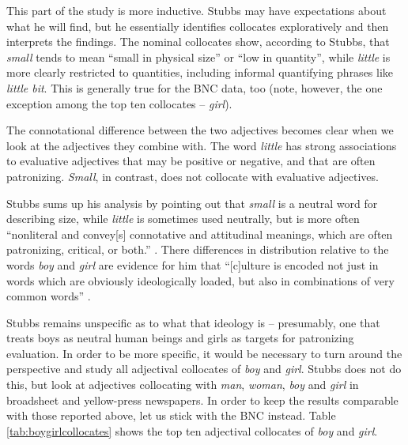 
This part of the study is more inductive. Stubbs may have expectations about what he will find, but he essentially identifies collocates exploratively and then interprets the findings. The nominal collocates show, according to Stubbs, that \textit{small} tends to mean ``small in physical size'' or ``low in quantity'', while \textit{little} is more clearly restricted to quantities, including informal quantifying phrases like \textit{little bit}. This is generally true for the BNC data, too (note, however, the one exception among the top ten collocates -- \textit{girl}).

The connotational difference between the two adjectives becomes clear when we look at the adjectives they combine with. The word \textit{little} has strong associations to evaluative adjectives that may be positive or negative, and that are often patronizing. \textit{Small}, in contrast, does not collocate with evaluative adjectives. 

Stubbs sums up his analysis by pointing out that \textit{small} is a neutral word for describing size, while \textit{little} is sometimes used neutrally, but is more often ``nonliteral and convey[s] connotative and attitudinal meanings, which are often patronizing, critical, or both.'' \citep[386]{stubbs_collocations_1995-1}. There differences in distribution relative to the words \textit{boy} and \textit{girl} are evidence for him that ``[c]ulture is encoded not just in words which are obviously ideologically loaded, but also in combinations of very common words'' \citep[387]{stubbs_collocations_1995-1}.

Stubbs remains unspecific as to what that ideology is -- presumably, one that treats boys as neutral human beings and girls as targets for patronizing evaluation. In order to be more specific, it would be necessary to turn around the perspective and study all adjectival collocates of \textit{boy} and \textit{girl}. Stubbs does not do this, but \citet{caldas-coulthard_curvy_2010} look at adjectives collocating with \textit{man}, \textit{woman}, \textit{boy} and \textit{girl} in broadsheet and yellow-press newspapers. In order to keep the results comparable with those reported above, let us stick with the BNC instead. Table \ref{tab:boygirlcollocates} shows the top ten adjectival collocates of \textit{boy} and \textit{girl}.

